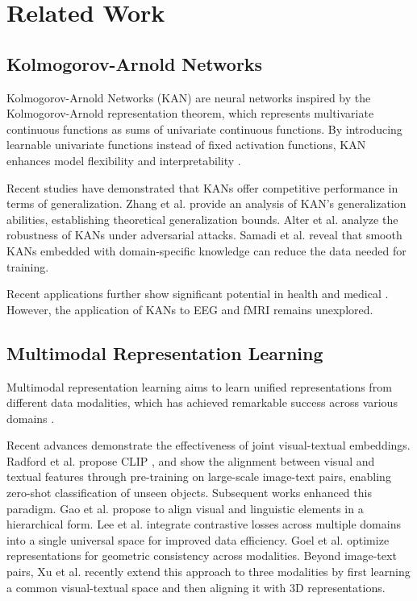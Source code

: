 \section{Related Work}
\label{sec:related_work}

\subsection{Kolmogorov-Arnold Networks}

Kolmogorov-Arnold Networks (KAN) \cite{liu2024kan,liu2024kan} are neural networks inspired by the Kolmogorov-Arnold representation theorem, which represents multivariate continuous functions as sums of univariate continuous functions. By introducing learnable univariate functions instead of fixed activation functions, KAN enhances model flexibility and interpretability \cite{somvanshi2024survey}.

Recent studies have demonstrated that KANs offer competitive performance in terms of generalization. Zhang et al. \cite{zhang2024generalization} provide an analysis of KAN's generalization abilities, establishing theoretical generalization bounds. Alter et al. \cite{alter2024robustness} analyze the robustness of KANs under adversarial attacks. Samadi et al. \cite{samadi2024smooth} reveal that smooth KANs embedded with domain-specific knowledge can reduce the data needed for training.
 
Recent applications further show significant potential in health and medical \cite{tang20243d,jahin2024kacq,aghaomidi2024ecg}. However, the application of KANs to EEG and fMRI remains unexplored.

\subsection{Multimodal Representation Learning}

Multimodal representation learning aims to learn unified representations from different data modalities, which has achieved remarkable success across various domains \cite{manzoor2023multimodality}.

Recent advances demonstrate the effectiveness of joint visual-textual embeddings.  Radford et al. propose CLIP \cite{radford2021learning}, and show the alignment between visual and textual features through pre-training on large-scale image-text pairs, enabling zero-shot classification of unseen objects. Subsequent works enhanced this paradigm. Gao et al. \cite{gao2022pyramidclip} propose to align visual and linguistic elements in a hierarchical form. Lee et al. \cite{lee2022uniclip} integrate contrastive losses across multiple domains into a single universal space for improved data efficiency. Goel et al. \cite{goel2022cyclip} optimize representations for geometric consistency across modalities. Beyond image-text pairs, Xu et al. \cite{xue2023ulip} recently extend this approach to three modalities by first learning a common visual-textual space and then aligning it with 3D representations.

